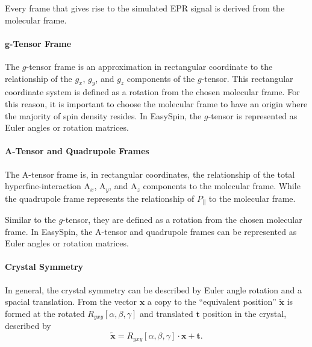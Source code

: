 Every frame that gives rise to the simulated EPR signal is derived from the molecular frame. 

\paragraph{g-Tensor Frame} The $g$-tensor frame is an approximation in rectangular coordinate to the relationship of the $g_x$, $g_y$, and $g_z$ components of the $g$-tensor. This rectangular coordinate system is defined as a rotation from the chosen molecular frame. For this reason, it is important to choose the molecular frame to have an origin where the majority of spin density resides. In EasySpin, the $g$-tensor is represented as Euler angles or rotation matrices.

\paragraph{A-Tensor and Quadrupole Frames} The A-tensor frame is, in rectangular coordinates, the relationship of the total hyperfine-interaction A$_x$, A$_y$, and A$_z$ components to the molecular frame. While the quadrupole frame represents the relationship of $P_{||}$ to the molecular frame. 

Similar to the $g$-tensor, they are defined as a rotation from the chosen molecular frame. In EasySpin, the A-tensor and quadrupole frames can be represented as Euler angles or rotation matrices. 

\paragraph*{Crystal Symmetry} In general, the crystal symmetry can be described by Euler angle rotation and a spacial translation. \cite{hovmoller1981rotation} From the vector $\mathbf{x}$ a copy to the ``equivalent position'' $\mathbf{\tilde{x}}$ is formed at the rotated $R_{yxy}[\alpha,\beta,\gamma]$ and translated $\mathbf{t}$ position in the crystal, described by
\begin{equation}
\mathbf{\tilde{x}} = R_{yxy}[\alpha,\beta,\gamma] \cdot \mathbf{x} + \mathbf{t}.
\end{equation}

